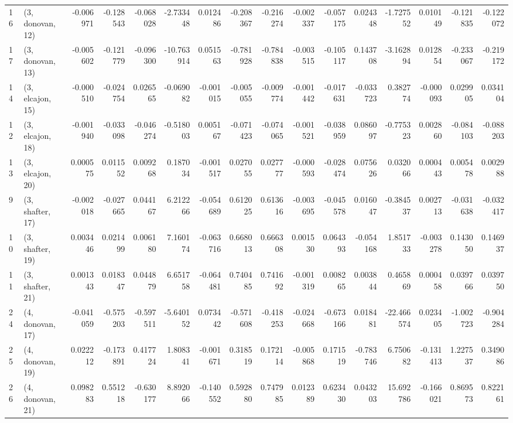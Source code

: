 \begin{tabular}{llrrrrrrrrrrrrrr}
16 &  (3, donovan, 12) &  -0.006971 & -0.128543 & -0.068028 &  -2.733448 &  0.012486 &  -0.208367 & -0.216274 & -0.002337 & -0.057175 &  0.024348 &  -1.727552 &  0.010149 & -0.121835 & -0.122072 \\
17 &  (3, donovan, 13) &  -0.005602 & -0.121779 & -0.096300 & -10.763914 &  0.051563 &  -0.781928 & -0.784838 & -0.003515 & -0.105117 &  0.143708 &  -3.162894 &  0.012854 & -0.233067 & -0.219172 \\
14 &  (3, elcajon, 15) &  -0.000510 & -0.024754 &  0.026565 &  -0.069082 & -0.001015 &  -0.005055 & -0.009774 & -0.001442 & -0.017631 & -0.033723 &   0.382774 & -0.000093 &  0.029905 &  0.034104 \\
12 &  (3, elcajon, 18) &  -0.001940 & -0.033098 & -0.046274 &  -0.518003 &  0.005167 &  -0.071423 & -0.074065 & -0.001521 & -0.038959 &  0.086097 &  -0.775323 &  0.002860 & -0.084103 & -0.088203 \\
13 &  (3, elcajon, 20) &   0.000575 &  0.011552 &  0.009268 &   0.187034 & -0.001517 &   0.027055 &  0.027777 & -0.000593 & -0.028474 &  0.075626 &   0.032066 &  0.000443 &  0.005478 &  0.002988 \\
9  &  (3, shafter, 17) &  -0.002018 & -0.027665 &  0.044167 &   6.212266 & -0.054689 &   0.612025 &  0.613616 & -0.003695 & -0.045578 &  0.016047 &  -0.384537 &  0.002713 & -0.031638 & -0.032417 \\
10 &  (3, shafter, 19) &   0.003446 &  0.021499 &  0.006180 &   7.160174 & -0.063716 &   0.668013 &  0.666308 &  0.001530 &  0.064393 & -0.054168 &   1.851733 & -0.003278 &  0.143050 &  0.146937 \\
11 &  (3, shafter, 21) &   0.001343 &  0.018347 &  0.044879 &   6.651758 & -0.064481 &   0.740485 &  0.741692 & -0.001319 &  0.008265 &  0.003844 &   0.465869 &  0.000458 &  0.039766 &  0.039750 \\
24 &  (4, donovan, 17) &  -0.041059 & -0.575203 & -0.597511 &  -5.640152 &  0.073442 &  -0.571608 & -0.418253 & -0.024668 & -0.673166 &  0.018481 & -22.466574 &  0.023405 & -1.002723 & -0.904284 \\
25 &  (4, donovan, 19) &   0.022212 & -0.173891 &  0.417724 &   1.808341 & -0.001671 &   0.318519 &  0.172114 & -0.005868 &  0.171519 & -0.783746 &   6.750682 & -0.131413 &  1.227537 &  0.349086 \\
26 &  (4, donovan, 21) &   0.098283 &  0.551218 & -0.630177 &   8.892066 & -0.140552 &   0.592880 &  0.747985 &  0.012389 &  0.623430 &  0.043203 &  15.692786 & -0.166021 &  0.869573 &  0.822161 \\

\end{tabular}
